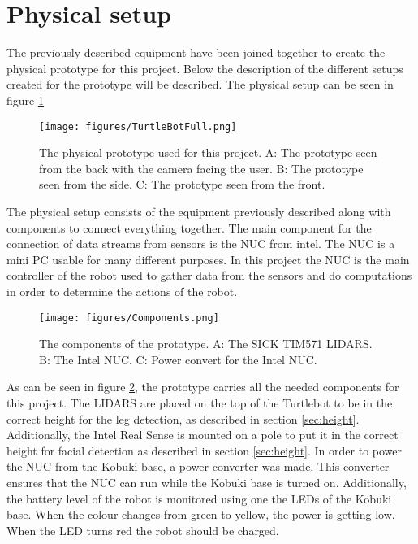 \section{Physical setup}
The previously described equipment have been joined together to create the physical prototype for this project. Below the description of the different setups created for the prototype will be described. The physical setup can be seen in figure \ref{fig:PhysicalSetup}\\

\begin{figure}[H]
    \centering
    \texttt{[image: figures/TurtleBotFull.png]}
    \caption{The physical prototype used for this project. A: The prototype seen from the back with the camera facing the user. B: The prototype seen from the side. C: The prototype seen from the front.}
    \label{fig:PhysicalSetup}
\end{figure}

The physical setup consists of the equipment previously described along with components to connect everything together. The main component for the connection of data streams from sensors is the NUC from intel. The NUC is a mini PC usable for many different purposes\cite{IntelNUC}. In this project the NUC is the main controller of the robot used to gather data from the sensors and do computations in order to determine the actions of the robot.\\

\begin{figure}[H]
    \centering
    \texttt{[image: figures/Components.png]}
    \caption{The components of the prototype. A: The SICK TIM571 LIDARS. B: The Intel NUC. C: Power convert for the Intel NUC.}
    \label{fig:Components}
\end{figure}

As can be seen in figure \ref{fig:Components}, the prototype carries all the needed components for this project. The LIDARS are placed on the top of the Turtlebot to be in the correct height for the leg detection, as described in section \ref{sec:height}. Additionally, the Intel Real Sense is mounted on a pole to put it in the correct height for facial detection as described in section \ref{sec:height}. In order to power the NUC from the Kobuki base, a power converter was made. This converter ensures that the NUC can run while the Kobuki base is turned on. Additionally, the battery level of the robot is monitored using one the LEDs of the Kobuki base. When the colour changes from green to yellow, the power is getting low. When the LED turns red the robot should be charged.\\